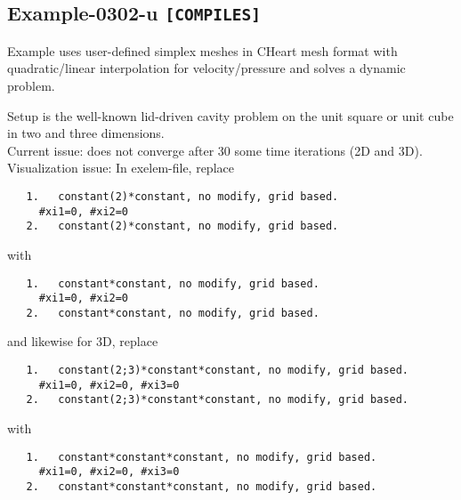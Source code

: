 %
\clearpage
%
\subsection{Example-0302-u \texttt{[COMPILES]}}
%
Example uses user-defined simplex meshes in CHeart mesh format with
quadratic/linear interpolation for velocity/pressure
and solves a dynamic problem.

Setup is the well-known lid-driven cavity problem
on the unit square or unit cube in two and three dimensions.\\[3ex]

Current issue: does not converge after 30 some time iterations (2D and 3D).\\[3ex]

Visualization issue: In exelem-file, replace

\begin{verbatim}
   1.   constant(2)*constant, no modify, grid based.
     #xi1=0, #xi2=0
   2.   constant(2)*constant, no modify, grid based.
\end{verbatim}

with

\begin{verbatim}
   1.   constant*constant, no modify, grid based.
     #xi1=0, #xi2=0
   2.   constant*constant, no modify, grid based.
\end{verbatim}

and likewise for 3D, replace

\begin{verbatim}
   1.   constant(2;3)*constant*constant, no modify, grid based.
     #xi1=0, #xi2=0, #xi3=0
   2.   constant(2;3)*constant*constant, no modify, grid based.
\end{verbatim}

with

\begin{verbatim}
   1.   constant*constant*constant, no modify, grid based.
     #xi1=0, #xi2=0, #xi3=0
   2.   constant*constant*constant, no modify, grid based.
\end{verbatim}


%
%
